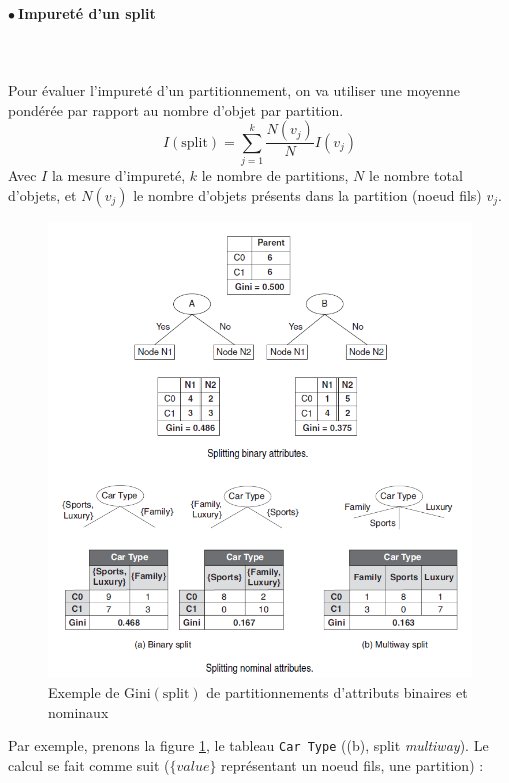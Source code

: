 \documentclass[letterpaper, 12pt]{article}
\newcommand{\alinea}{
\hspace*{0.5cm}}
\newcommand{\point}{$\bullet\ $}
\begin{document}
			\paragraph{\point Impureté d'un split}~\\~\\
				\alinea Pour évaluer 
				l'impureté d'un partitionnement, on va utiliser une
				moyenne pondérée par rapport au nombre d'objet
				par partition.
				$$ I(\text{split}) = \sum_{j=1}^{k}\frac{N(v_j)}{N} 
					I(v_j) $$
				Avec $I$ la mesure d'impureté, $k$ le nombre de partitions,
				$N$ le nombre total d'objets, et $N(v_j)$ le nombre d'objets
				présents dans la partition (noeud fils) $v_j$.
			\begin{figure}[H]
				\centering
				\includegraphics[scale=0.8]{Images/tree_split_measure.png}
				\caption{Exemple de $\text{Gini}(\text{split})$ de
						 partitionnements d'attributs 
						 binaires et nominaux}
				\label{fig:tree:split_measure}
			\end{figure}\noindent
			Par exemple, prenons la figure \ref{fig:tree:split_measure},
			le tableau \texttt{Car Type} ((b), split \textit{multiway}).
			Le calcul se fait comme suit ($\{value\}$ représentant un 
			noeud fils, une partition) : 
\end{document}
